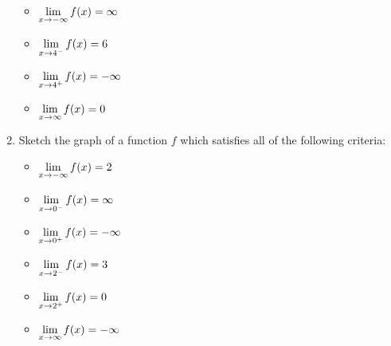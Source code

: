 \begin{enumerate}
\begin{multicols}{4}
\begin{itemize}

\item $\displaystyle{\lim_{x \rightarrow -\infty}  f(x) = \infty}$

\item $\displaystyle{\lim_{x \rightarrow 4^{-}} f(x) = 6}$

\item $\displaystyle{\lim_{x \rightarrow 4^{+}} f(x) = - \infty}$

\item $\displaystyle{\lim_{x \rightarrow \infty}  f(x) =0}$

\end{itemize}

\end{multicols}

\item Sketch the graph of a function $f$  which satisfies all of the following criteria:

\bigskip

\begin{multicols}{3}

\begin{itemize}

\item $\displaystyle{\lim_{x \rightarrow -\infty} f(x) = 2}$

\item $\displaystyle{\lim_{x \rightarrow 0^{-}} f(x) = \infty}$

\item $\displaystyle{\lim_{x \rightarrow 0^{+}} f(x) = -\infty}$

\end{itemize}

\end{multicols}

\bigskip

\begin{multicols}{3}

\begin{itemize}

\item $\displaystyle{\lim_{x \rightarrow 2^{-}} f(x) = 3}$

\item $\displaystyle{\lim_{x \rightarrow 2^{+}} f(x) =0}$

\item $\displaystyle{\lim_{x \rightarrow \infty} f(x) = -\infty}$

\end{itemize}

\end{multicols}



\end{enumerate}
